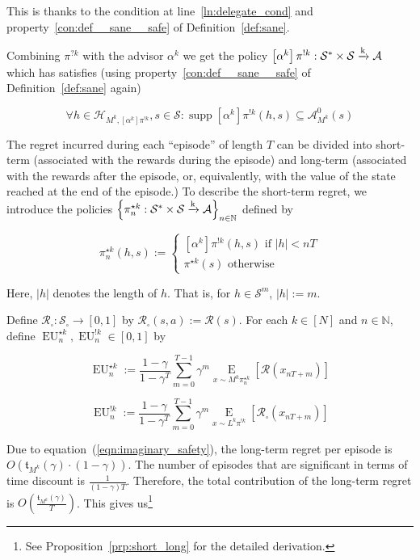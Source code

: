 \documentclass[anon,12pt]{colt2018} %
\DeclareMathOperator{\Supp}{supp}
\newcommand{\AP}[1]{\left(#1\right)}
\newcommand{\AB}[1]{\left[#1\right]}
\newcommand{\AC}[1]{\left\{#1\right\}}
\newcommand{\Ea}[2]{\underset{#1}{\operatorname{E}}\AB{#2}}
\newcommand{\Nats}{\mathbb{N}}
\newcommand{\Abs}[1]{\left\vert #1 \right\vert}
\newcommand{\K}{\xrightarrow{\textnormal{k}}}
\newcommand{\A}{\mathcal{A}}
\newcommand{\St}{\mathcal{S}}
\newcommand{\R}{\mathcal{R}}
\newcommand{\EU}{\operatorname{EU}}
\newcommand{\MP}[2]{#1#2}
\newcommand{\AdP}[2]{\AB{#1}#2}
\newcommand{\Tn}{\mathfrak{t}}
\newcommand{\Ad}{\alpha}
\newcommand{\FH}{\mathcal{H}}
\newcommand{\IP}{\pi^{!k}}
\begin{document}

This is thanks to the condition at line~\ref{ln:delegate_cond} and property~\ref{con:def__sane__safe} of Definition~\ref{def:sane}.

Combining $\pi^{?k}$ with the advisor $\alpha^k$ we get the policy $\AdP{\Ad^k}{\IP}: \St^*\times\St\K\A$ which has satisfies (using property~\ref{con:def__sane__safe} of Definition~\ref{def:sane} again)

\begin{equation}
\label{eqn:imaginary_safety}
\forall h\in\FH_{M^k,\AdP{\Ad^k}{\IP}},s\in\St: \Supp{\AdP{\Ad^k}{\IP}(h,s)} \subseteq \A_{M^k}^0(s)
\end{equation}

The regret incurred during each \enquote{episode} of length $T$ can be divided into short-term (associated with the rewards during the episode) and long-term (associated with the rewards after the episode, or, equivalently, with the value of the state reached at the end of the episode.) To describe the short-term regret, we introduce the policies $\AC{\pi_n^{\star k}: \St^* \times \St \K \A}_{n \in \Nats}$ defined by

\begin{equation}
\pi_n^{\star k}(h,s):=\begin{cases} \AdP{\Ad^k}{\IP}(h,s) \text{ if } \Abs{h} < nT \\ \pi^{\star k}(s) \text{ otherwise} \end{cases}
\end{equation}

Here, $\Abs{h}$ denotes the length of $h$. That is, for $h \in \St^m$, $\Abs{h}:=m$.

Define $\R_\square: \St_\square \rightarrow [0,1]$ by $\R_\square(s,a):=\R(s)$. For each $k\in[N]$ and $n\in\Nats$, define $\EU_n^{\star k},\EU_n^{!k}\in[0,1]$ by

\begin{equation}
\EU_n^{\star k}:=\frac{1-\gamma}{1-\gamma^T}\sum_{m=0}^{T-1} \gamma^m \Ea{x\sim{\MP{M^k}{\pi_n^{\star  k}}}}{\R\AP{x_{nT+m}}}
\end{equation}

\begin{equation}
\EU_n^{!k}:=\frac{1-\gamma}{1-\gamma^T}\sum_{m=0}^{T-1} \gamma^m \Ea{x\sim{\MP{L^k}{\IP}}}{\R_\square\AP{x_{nT+m}}}
\end{equation}

Due to equation~(\ref{eqn:imaginary_safety}), the long-term regret per episode is $O\AP{\Tn_{M^k}(\gamma)\cdot(1-\gamma)}$. The number of episodes that are significant in terms of time discount is $\frac{1}{(1-\gamma)T}$. Therefore, the total contribution of the long-term regret is $O\AP{\frac{\Tn_{M^k}(\gamma)}{T}}$. This gives us\footnote{See Proposition~\ref{prp:short_long} for the detailed derivation.}
\end{document}
